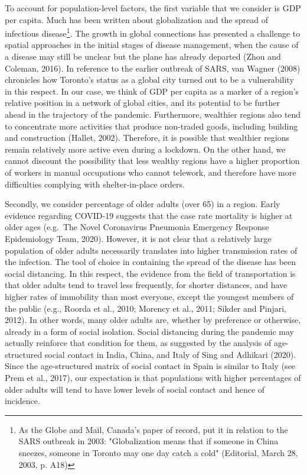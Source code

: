 \documentclass[]{elsarticle} %
\begin{document}
To account for population-level factors, the first variable that we
consider is GDP per capita. Much has been written about globalization
and the spread of infectious
disease\footnote{As the Globe and Mail, Canada's paper of record, put it in relation to the SARS outbreak in 2003: "Globalization means that if someone in China sneezes, someone in Toronto may one day catch a cold" (Editorial, March 28, 2003, p. A18)}.
The growth in global connections has presented a challenge to spatial
approaches in the initial stages of disease management, when the cause
of a disease may still be unclear but the plane has already departed
(Zhou and Coleman, 2016). In reference to the earlier outbreak of SARS,
van Wagner (2008) chronicles how Toronto's status as a global city
turned out to be a vulnerability in this respect. In our case, we think
of GDP per capita as a marker of a region's relative position in a
network of global cities, and its potential to be further ahead in the
trajectory of the pandemic. Furthermore, wealthier regions also tend to
concentrate more activities that produce non-traded goods, including
building and construction (Hallet, 2002). Therefore, it is possible that
wealthier regions remain relatively more active even during a lockdown.
On the other hand, we cannot discount the possibility that less wealthy
regions have a higher proportion of workers in manual occupations who
cannot telework, and therefore have more difficulties complying with
shelter-in-place orders.

Secondly, we consider percentage of older adults (over 65) in a region.
Early evidence regarding COVID-19 suggests that the case rate mortality
is higher at older ages (e.g.~The Novel Coronavirus Pneumonia Emergency
Response Epidemiology Team, 2020). However, it is not clear that a
relatively large population of older adults necessarily translates into
higher transmission rates of the infection. The tool of choice in
containing the spread of the disease has been social distancing. In this
respect, the evidence from the field of transportation is that older
adults tend to travel less frequently, for shorter distances, and have
higher rates of immobility than most everyone, except the youngest
members of the public (e.g., Roorda et al., 2010; Morency et al., 2011;
Sikder and Pinjari, 2012). In other words, many older adults are,
whether by preference or otherwise, already in a form of social
isolation. Social distancing during the pandemic may actually reinforce
that condition for them, as suggested by the analysis of age-structured
social contact in India, China, and Italy of Sing and Adhikari (2020).
Since the age-structured matrix of social contact in Spain is similar to
Italy (see Prem et al., 2017), our expectation is that populations with
higher percentages of older adults will tend to have lower levels of
social contact and hence of incidence.
\end{document}
